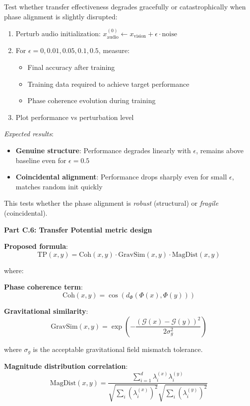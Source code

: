 Test whether transfer effectiveness degrades gracefully or catastrophically when phase alignment is slightly disrupted:

\begin{enumerate}
\item Perturb audio initialization: $x_{\text{audio}}^{(0)} \leftarrow x_{\text{vision}} + \epsilon \cdot \text{noise}$
\item For $\epsilon = 0, 0.01, 0.05, 0.1, 0.5$, measure:
\begin{itemize}
\item Final accuracy after training
\item Training data required to achieve target performance
\item Phase coherence evolution during training
\end{itemize}
\item Plot performance vs perturbation level
\end{enumerate}

\textit{Expected results}:
\begin{itemize}
\item \textbf{Genuine structure}: Performance degrades linearly with $\epsilon$, remains above baseline even for $\epsilon = 0.5$
\item \textbf{Coincidental alignment}: Performance drops sharply even for small $\epsilon$, matches random init quickly
\end{itemize}

This tests whether the phase alignment is \textit{robust} (structural) or \textit{fragile} (coincidental).

\textbf{Part C.6: Transfer Potential metric design}

\textbf{Proposed formula}:
$$\text{TP}(x, y) = \text{Coh}(x,y) \cdot \text{GravSim}(x,y) \cdot \text{MagDist}(x,y)$$

where:

\textbf{Phase coherence term}:
$$\text{Coh}(x,y) = \cos(d_{\Phi}(\Phi(x), \Phi(y)))$$

\textbf{Gravitational similarity}:
$$\text{GravSim}(x,y) = \exp\left(-\frac{(\mathcal{G}(x) - \mathcal{G}(y))^2}{2\sigma_g^2}\right)$$

where $\sigma_g$ is the acceptable gravitational field mismatch tolerance.

\textbf{Magnitude distribution correlation}:
$$\text{MagDist}(x,y) = \frac{\sum_{i=1}^{d} \lambda_i^{(x)} \lambda_i^{(y)}}{\sqrt{\sum_i (\lambda_i^{(x)})^2} \sqrt{\sum_i (\lambda_i^{(y)})^2}}$$


